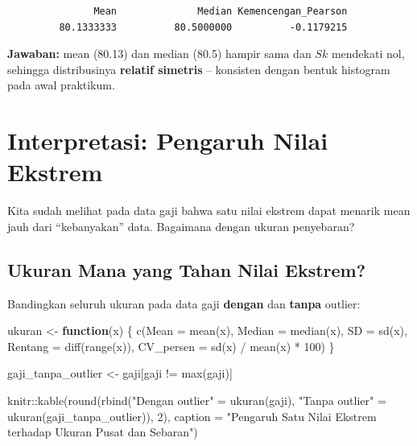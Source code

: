 \documentclass[
  indonesian,
  letterpaper,
]{book}
\newenvironment{Shaded}{\begin{snugshade}}{\end{snugshade}}
\newcommand{\AttributeTok}[1]{\textcolor[rgb]{0.40,0.45,0.13}{#1}}
\newcommand{\ControlFlowTok}[1]{\textcolor[rgb]{0.00,0.23,0.31}{\textbf{#1}}}
\newcommand{\DecValTok}[1]{\textcolor[rgb]{0.68,0.00,0.00}{#1}}
\newcommand{\FunctionTok}[1]{\textcolor[rgb]{0.28,0.35,0.67}{#1}}
\newcommand{\NormalTok}[1]{\textcolor[rgb]{0.00,0.23,0.31}{#1}}
\newcommand{\OtherTok}[1]{\textcolor[rgb]{0.00,0.23,0.31}{#1}}
\newcommand{\SpecialCharTok}[1]{\textcolor[rgb]{0.37,0.37,0.37}{#1}}
\newcommand{\StringTok}[1]{\textcolor[rgb]{0.13,0.47,0.30}{#1}}
\begin{document}
\begin{verbatim}
               Mean              Median Kemencengan_Pearson 
         80.1333333          80.5000000          -0.1179215 
\end{verbatim}

\textbf{Jawaban:} mean (80.13) dan median (80.5) hampir sama dan \(Sk\)
mendekati nol, sehingga distribusinya \textbf{relatif simetris} --
konsisten dengan bentuk histogram pada awal praktikum.

\section{Interpretasi: Pengaruh Nilai
Ekstrem}\label{interpretasi-pengaruh-nilai-ekstrem}

Kita sudah melihat pada data gaji bahwa satu nilai ekstrem dapat menarik
mean jauh dari ``kebanyakan'' data. Bagaimana dengan ukuran penyebaran?

\subsection{Ukuran Mana yang Tahan Nilai
Ekstrem?}\label{ukuran-mana-yang-tahan-nilai-ekstrem}

Bandingkan seluruh ukuran pada data gaji \textbf{dengan} dan
\textbf{tanpa} outlier:

\begin{Shaded}
\begin{Highlighting}[]
\NormalTok{ukuran }\OtherTok{\textless{}{-}} \ControlFlowTok{function}\NormalTok{(x) \{}
\FunctionTok{c}\NormalTok{(}\AttributeTok{Mean =} \FunctionTok{mean}\NormalTok{(x), }\AttributeTok{Median =} \FunctionTok{median}\NormalTok{(x), }\AttributeTok{SD =} \FunctionTok{sd}\NormalTok{(x),}
\AttributeTok{Rentang =} \FunctionTok{diff}\NormalTok{(}\FunctionTok{range}\NormalTok{(x)), }\AttributeTok{CV\_persen =} \FunctionTok{sd}\NormalTok{(x) }\SpecialCharTok{/} \FunctionTok{mean}\NormalTok{(x) }\SpecialCharTok{*} \DecValTok{100}\NormalTok{)}
\NormalTok{\}}

\NormalTok{gaji\_tanpa\_outlier }\OtherTok{\textless{}{-}}\NormalTok{ gaji[gaji }\SpecialCharTok{!=} \FunctionTok{max}\NormalTok{(gaji)]}

\NormalTok{knitr}\SpecialCharTok{::}\FunctionTok{kable}\NormalTok{(}\FunctionTok{round}\NormalTok{(}\FunctionTok{rbind}\NormalTok{(}\StringTok{"Dengan outlier"} \OtherTok{=} \FunctionTok{ukuran}\NormalTok{(gaji),}
\StringTok{"Tanpa outlier"}  \OtherTok{=} \FunctionTok{ukuran}\NormalTok{(gaji\_tanpa\_outlier)), }\DecValTok{2}\NormalTok{),}
\AttributeTok{caption =} \StringTok{"Pengaruh Satu Nilai Ekstrem terhadap Ukuran Pusat dan Sebaran"}\NormalTok{)}
\end{Highlighting}
\end{Shaded}
\end{document}
